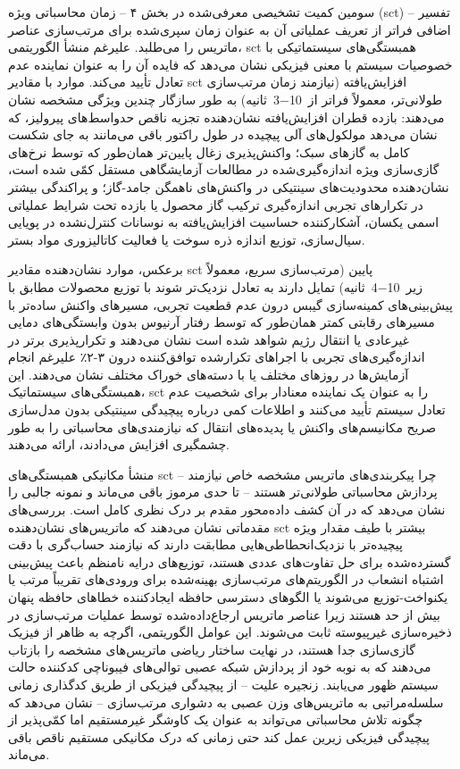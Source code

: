 \documentclass[12pt, a4paper]{article}
\begin{document}
سومین کمیت تشخیصی معرفی‌شده در بخش ۴ – زمان محاسباتی ویژه (sct) – تفسیر اضافی فراتر از تعریف عملیاتی آن به عنوان زمان سپری‌شده برای مرتب‌سازی عناصر ماتریس را می‌طلبد. علیرغم منشأ الگوریتمی، sct همبستگی‌های سیستماتیکی با خصوصیات سیستم با معنی فیزیکی نشان می‌دهد که فایده آن را به عنوان نماینده عدم تعادل تأیید می‌کند. موارد با مقادیر sct افزایش‌یافته (نیازمند زمان مرتب‌سازی طولانی‌تر، معمولاً فراتر از 10−3 ثانیه) به طور سازگار چندین ویژگی مشخصه نشان می‌دهند: بازده قطران افزایش‌یافته نشان‌دهنده تجزیه ناقص حدواسط‌های پیرولیز، که نشان می‌دهد مولکول‌های آلی پیچیده در طول راکتور باقی می‌مانند به جای شکست کامل به گازهای سبک؛ واکنش‌پذیری زغال پایین‌تر همان‌طور که توسط نرخ‌های گازی‌سازی ویژه اندازه‌گیری‌شده در مطالعات آزمایشگاهی مستقل کمّی شده است، نشان‌دهنده محدودیت‌های سینتیکی در واکنش‌های ناهمگن جامد-گاز؛ و پراکندگی بیشتر در تکرارهای تجربی اندازه‌گیری ترکیب گاز محصول یا بازده تحت شرایط عملیاتی اسمی یکسان، آشکارکننده حساسیت افزایش‌یافته به نوسانات کنترل‌نشده در پویایی سیال‌سازی، توزیع اندازه ذره سوخت یا فعالیت کاتالیزوری مواد بستر.

برعکس، موارد نشان‌دهنده مقادیر sct پایین (مرتب‌سازی سریع، معمولاً زیر 10−4 ثانیه) تمایل دارند به تعادل نزدیک‌تر شوند با توزیع محصولات مطابق با پیش‌بینی‌های کمینه‌سازی گیبس درون عدم قطعیت تجربی، مسیرهای واکنش ساده‌تر با مسیرهای رقابتی کمتر همان‌طور که توسط رفتار آرنیوس بدون وابستگی‌های دمایی غیرعادی یا انتقال رژیم شواهد شده است نشان می‌دهند و تکرارپذیری برتر در اندازه‌گیری‌های تجربی با اجراهای تکرارشده توافق‌کننده درون ۳-۲٪ علیرغم انجام آزمایش‌ها در روزهای مختلف یا با دسته‌های خوراک مختلف نشان می‌دهند. این همبستگی‌های سیستماتیک، sct را به عنوان یک نماینده معنادار برای شخصیت عدم تعادل سیستم تأیید می‌کنند و اطلاعات کمی درباره پیچیدگی سینتیکی بدون مدل‌سازی صریح مکانیسم‌های واکنش یا پدیده‌های انتقال که نیازمندی‌های محاسباتی را به طور چشمگیری افزایش می‌دادند، ارائه می‌دهند.

منشأ مکانیکی همبستگی‌های sct – چرا پیکربندی‌های ماتریس مشخصه خاص نیازمند پردازش محاسباتی طولانی‌تر هستند – تا حدی مرموز باقی می‌ماند و نمونه جالبی را نشان می‌دهد که در آن کشف داده‌محور مقدم بر درک نظری کامل است. بررسی‌های مقدماتی نشان می‌دهند که ماتریس‌های نشان‌دهنده sct بیشتر با طیف مقدار ویژه پیچیده‌تر با نزدیک‌انحطاطی‌هایی مطابقت دارند که نیازمند حساب‌گری با دقت گسترده‌شده برای حل تفاوت‌های عددی هستند، توزیع‌های درایه نامنظم باعث پیش‌بینی اشتباه انشعاب در الگوریتم‌های مرتب‌سازی بهینه‌شده برای ورودی‌های تقریباً مرتب یا یکنواخت-توزیع می‌شوند یا الگوهای دسترسی حافظه ایجادکننده خطاهای حافظه پنهان بیش از حد هستند زیرا عناصر ماتریس ارجاع‌داده‌شده توسط عملیات مرتب‌سازی در ذخیره‌سازی غیرپیوسته ثابت می‌شوند. این عوامل الگوریتمی، اگرچه به ظاهر از فیزیک گازی‌سازی جدا هستند، در نهایت ساختار ریاضی ماتریس‌های مشخصه را بازتاب می‌دهند که به نوبه خود از پردازش شبکه عصبی توالی‌های فیبوناچی کدکننده حالت سیستم ظهور می‌یابند. زنجیره علیت – از پیچیدگی فیزیکی از طریق کدگذاری زمانی سلسله‌مراتبی به ماتریس‌های وزن عصبی به دشواری مرتب‌سازی – نشان می‌دهد که چگونه تلاش محاسباتی می‌تواند به عنوان یک کاوشگر غیرمستقیم اما کمّی‌پذیر از پیچیدگی فیزیکی زیرین عمل کند حتی زمانی که درک مکانیکی مستقیم ناقص باقی می‌ماند.
\end{document}
